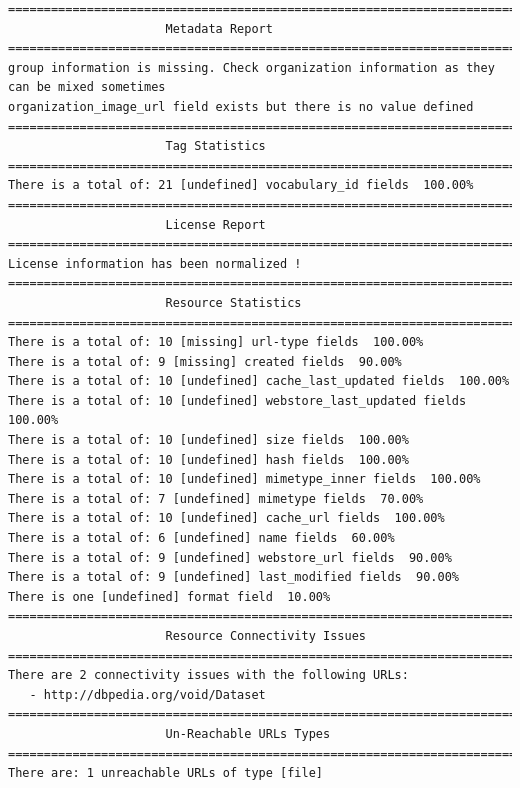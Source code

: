 \documentclass[runningheads,a4paper]{llncs}
\begin{document}
\begin{lstlisting}
=======================================================================
                      Metadata Report
=======================================================================
group information is missing. Check organization information as they can be mixed sometimes
organization_image_url field exists but there is no value defined
=======================================================================
                      Tag Statistics
=======================================================================
There is a total of: 21 [undefined] vocabulary_id fields  100.00%
=======================================================================
                      License Report
=======================================================================
License information has been normalized !
=======================================================================
                      Resource Statistics
=======================================================================
There is a total of: 10 [missing] url-type fields  100.00%
There is a total of: 9 [missing] created fields  90.00%
There is a total of: 10 [undefined] cache_last_updated fields  100.00%
There is a total of: 10 [undefined] webstore_last_updated fields  100.00%
There is a total of: 10 [undefined] size fields  100.00%
There is a total of: 10 [undefined] hash fields  100.00%
There is a total of: 10 [undefined] mimetype_inner fields  100.00%
There is a total of: 7 [undefined] mimetype fields  70.00%
There is a total of: 10 [undefined] cache_url fields  100.00%
There is a total of: 6 [undefined] name fields  60.00%
There is a total of: 9 [undefined] webstore_url fields  90.00%
There is a total of: 9 [undefined] last_modified fields  90.00%
There is one [undefined] format field  10.00%
=======================================================================
                      Resource Connectivity Issues
=======================================================================
There are 2 connectivity issues with the following URLs:
   - http://dbpedia.org/void/Dataset
=======================================================================
                      Un-Reachable URLs Types
=======================================================================
There are: 1 unreachable URLs of type [file]
\end{lstlisting}
\end{document}
